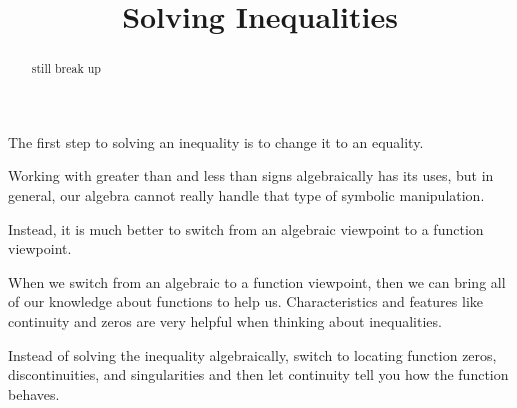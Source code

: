 \documentclass{ximera}
\title{Solving Inequalities}
\begin{document}
\begin{abstract}
still break up
\end{abstract}
\maketitle



The first step to solving an inequality is to change it to an equality. 


Working with greater than and less than signs algebraically has its uses, but in general, our algebra cannot really handle that type of symbolic manipulation. 


Instead, it is much better to switch from an algebraic viewpoint to a function viewpoint. 


When we switch from an algebraic to a function viewpoint, then we can bring all of our knowledge about functions to help us. Characteristics and features like continuity and zeros are very helpful when thinking about inequalities. 


Instead of solving the inequality algebraically, switch to locating function zeros, discontinuities, and singularities and then let continuity tell you how the function behaves. 
\end{document}
